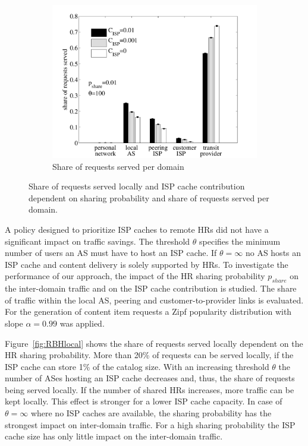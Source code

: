 \begin{figure}[ht!]
\begin{subfigure}[b]{0.32\textwidth}
\includegraphics[width=\textwidth]{hierarchical/simulative/figures/RBHall}
\caption{Share of requests served per domain}
\label{fig:RBHall}
\end{subfigure}
\caption{Share of requests served locally and ISP cache contribution dependent on sharing probability and share of requests served per domain.}
\end{figure}

A policy designed to prioritize ISP caches to remote HRs did not have a significant impact on traffic savings.
The threshold $\theta$ specifies the minimum number of users an AS must have to host an ISP cache. If $\theta=\infty$ no AS hosts an ISP cache and content delivery is solely supported by HRs.
To investigate the performance of our approach, the impact of the HR sharing probability $p_{share}$ on the inter-domain traffic and on the ISP cache contribution is studied. The share of traffic within the local AS, peering and customer-to-provider links is evaluated.
For the generation of content item requests a Zipf popularity distribution with slope $\alpha=0.99$ was applied.


Figure~\ref{fig:RBHlocal} shows the share of requests served locally dependent on the HR sharing probability. More than 20\% of requests can be served locally, if the ISP cache can store 1\% of the catalog size. With an increasing threshold $\theta$ the number of ASes hosting an ISP cache decreases and, thus, the share of requests being served locally. If the number of shared HRs increases, more traffic can be kept locally. This effect is stronger for a lower ISP cache capacity. In case of $\theta=\infty$ where no ISP caches are available, the sharing probability has the strongest impact on inter-domain traffic. For a high sharing probability the ISP cache size has only little impact on the inter-domain traffic.

